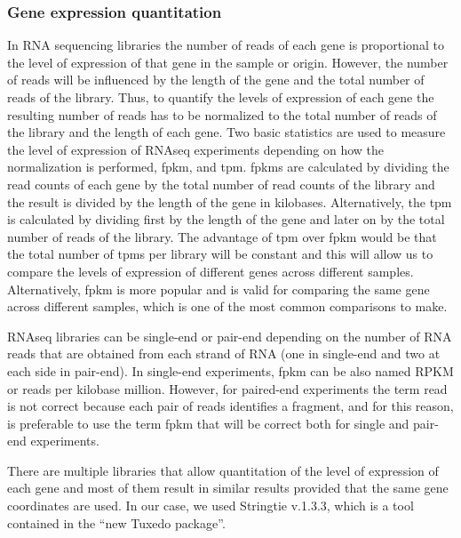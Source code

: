 \subsubsection{Gene expression quantitation}
In RNA sequencing libraries the number of reads of each gene is proportional to the level of expression of that gene in the sample or origin. However, the number of reads will be influenced by the length of the gene and the total number of reads of the library. Thus, to quantify the levels of expression of each gene the resulting number of reads has to be normalized to the total number of reads of the library and the length of each gene. Two basic statistics are used to measure the level of expression of RNAseq experiments depending on how the normalization is performed, \gls{fpkm}, and \gls{tpm}. \glspl{fpkm} are calculated by dividing the read counts of each gene by the total number of read counts of the library and the result is divided by the length of the gene in kilobases. Alternatively, the \gls{tpm} is calculated by dividing first by the length of the gene and later on by the total number of reads of the library. The advantage of \gls{tpm} over \gls{fpkm} would be that the total number of \glspl{tpm} per library will be constant and this will allow us to compare the levels of expression of different genes across different samples. Alternatively, \gls{fpkm} is more popular and is valid for comparing the same gene across different samples, which is one of the most common comparisons to make.

RNAseq libraries can be single-end or pair-end depending on the number of RNA reads that are obtained from each strand of RNA (one in single-end and two at each side in pair-end). In single-end experiments, \gls{fpkm} can be also named RPKM or reads per kilobase million. However, for paired-end experiments the term read is not correct because each pair of reads identifies a fragment, and for this reason, is preferable to use the term \gls{fpkm} that will be correct both for single and pair-end experiments.

There are multiple libraries that allow quantitation of the level of expression of each gene and most of them result in similar results provided that the same gene coordinates are used. In our case, we used Stringtie v.1.3.3, which is a tool contained in the “new Tuxedo package”.\cite{Pertea2016}

